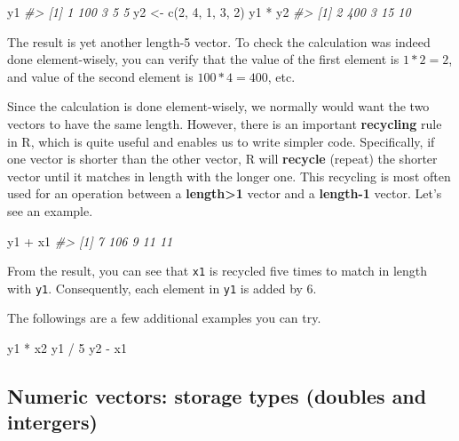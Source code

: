\documentclass[
]{book}
\newenvironment{Shaded}{\begin{snugshade}}{\end{snugshade}}
\newcommand{\CommentTok}[1]{\textcolor[rgb]{0.56,0.35,0.01}{\textit{#1}}}
\newcommand{\DecValTok}[1]{\textcolor[rgb]{0.00,0.00,0.81}{#1}}
\newcommand{\FunctionTok}[1]{\textcolor[rgb]{0.00,0.00,0.00}{#1}}
\newcommand{\NormalTok}[1]{#1}
\newcommand{\OtherTok}[1]{\textcolor[rgb]{0.56,0.35,0.01}{#1}}
\newcommand{\SpecialCharTok}[1]{\textcolor[rgb]{0.00,0.00,0.00}{#1}}
\begin{document}
\begin{Shaded}
\begin{Highlighting}[]
\NormalTok{y1}
\CommentTok{\#\textgreater{} [1]   1 100   3   5   5}
\NormalTok{y2 }\OtherTok{\textless{}{-}} \FunctionTok{c}\NormalTok{(}\DecValTok{2}\NormalTok{, }\DecValTok{4}\NormalTok{, }\DecValTok{1}\NormalTok{, }\DecValTok{3}\NormalTok{, }\DecValTok{2}\NormalTok{)}
\NormalTok{y1 }\SpecialCharTok{*}\NormalTok{ y2}
\CommentTok{\#\textgreater{} [1]   2 400   3  15  10}
\end{Highlighting}
\end{Shaded}

The result is yet another length-5 vector. To check the calculation was indeed done element-wisely, you can verify that the value of the first element is \(1 * 2 = 2\), and value of the second element is \(100 * 4 = 400\), etc.

Since the calculation is done element-wisely, we normally would want the two vectors to have the same length. However, there is an important \textbf{recycling} rule in R, which is quite useful and enables us to write simpler code. Specifically, if one vector is shorter than the other vector, R will \textbf{recycle} (repeat) the shorter vector until it matches in length with the longer one. This recycling is most often used for an operation between a \textbf{length\textgreater1} vector and a \textbf{length-1} vector. Let's see an example.

\begin{Shaded}
\begin{Highlighting}[]
\NormalTok{y1 }\SpecialCharTok{+}\NormalTok{ x1}
\CommentTok{\#\textgreater{} [1]   7 106   9  11  11}
\end{Highlighting}
\end{Shaded}

From the result, you can see that \texttt{x1} is recycled five times to match in length with \texttt{y1}. Consequently, each element in \texttt{y1} is added by 6.

The followings are a few additional examples you can try.

\begin{Shaded}
\begin{Highlighting}[]
\NormalTok{y1 }\SpecialCharTok{*}\NormalTok{ x2}
\NormalTok{y1 }\SpecialCharTok{/} \DecValTok{5}
\NormalTok{y2 }\SpecialCharTok{{-}}\NormalTok{ x1}
\end{Highlighting}
\end{Shaded}

\hypertarget{storage-type}{%
\subsection{Numeric vectors: storage types (doubles and intergers)}\label{storage-type}}
\end{document}
